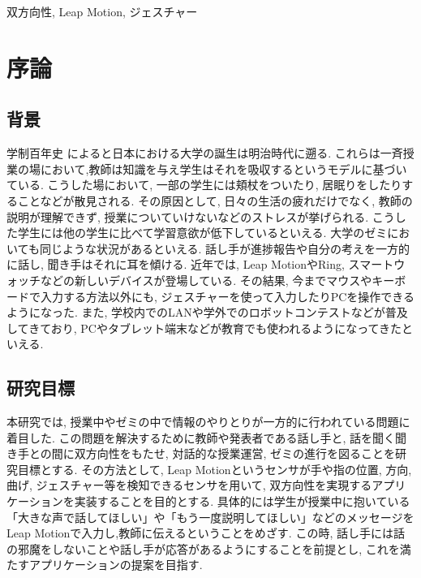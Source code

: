 \documentclass{funthesis}
\begin{document}
\begin{jkeyword}
双方向性, Leap Motion, ジェスチャー
\end{jkeyword}

\tableofcontents %


\chapter{序論} %


\section{背景} %


学制百年史\cite{A1} によると日本における大学の誕生は明治時代に遡る. これらは一斉授業の場において,教師は知識を与え学生はそれを吸収するというモデルに基づいている. こうした場において, 一部の学生には頬杖をついたり, 居眠りをしたりすることなどが散見される. その原因として, 日々の生活の疲れだけでなく, 教師の説明が理解できず, 授業についていけないなどのストレスが挙げられる. こうした学生には他の学生に比べて学習意欲が低下しているといえる. 大学のゼミにおいても同じような状況があるといえる. 話し手が進捗報告や自分の考えを一方的に話し, 聞き手はそれに耳を傾ける. 近年では, Leap MotionやRing, スマートウォッチなどの新しいデバイスが登場している. その結果, 今までマウスやキーボードで入力する方法以外にも, ジェスチャーを使って入力したりPCを操作できるようになった. また, 学校内でのLANや学外でのロボットコンテストなどが普及してきており,  PCやタブレット端末などが教育でも使われるようになってきたといえる. 

\section{研究目標}
本研究では, 授業中やゼミの中で情報のやりとりが一方的に行われている問題に着目した. この問題を解決するために教師や発表者である話し手と, 話を聞く聞き手との間に双方向性をもたせ,  対話的な授業運営, ゼミの進行を図ることを研究目標とする. その方法として, Leap Motionというセンサが手や指の位置, 方向, 曲げ, ジェスチャー等を検知できるセンサを用いて, 双方向性を実現するアプリケーションを実装することを目的とする. 具体的には学生が授業中に抱いている「大きな声で話してほしい」や「もう一度説明してほしい」などのメッセージをLeap Motionで入力し,教師に伝えるということをめざす. この時, 話し手には話の邪魔をしないことや話し手が応答があるようにすることを前提とし, これを満たすアプリケーションの提案を目指す. 
\end{document}
